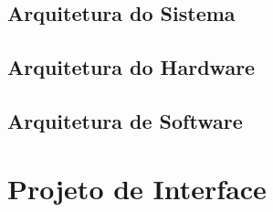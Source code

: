     \subsection{Arquitetura do Sistema}



    \subsection{Arquitetura do Hardware}


    \subsection{Arquitetura de Software}




\section{Projeto de Interface}


